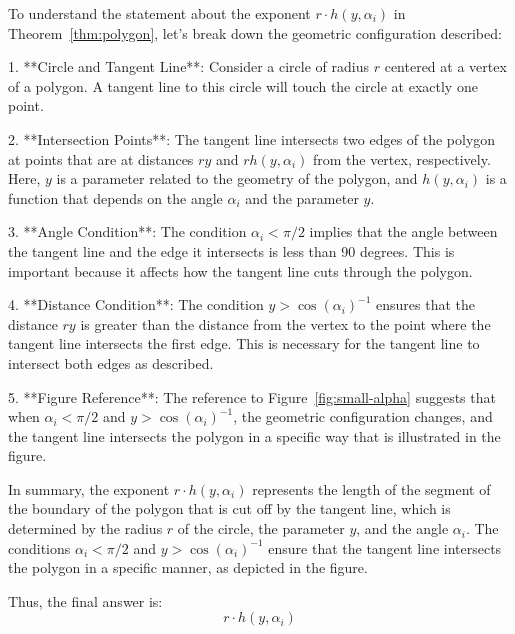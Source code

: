 To understand the statement about the exponent \( r \cdot h(y, \alpha_i) \) in Theorem~\ref{thm:polygon}, let's break down the geometric configuration described:

1. **Circle and Tangent Line**: Consider a circle of radius \( r \) centered at a vertex of a polygon. A tangent line to this circle will touch the circle at exactly one point.

2. **Intersection Points**: The tangent line intersects two edges of the polygon at points that are at distances \( ry \) and \( r h(y, \alpha_i) \) from the vertex, respectively. Here, \( y \) is a parameter related to the geometry of the polygon, and \( h(y, \alpha_i) \) is a function that depends on the angle \( \alpha_i \) and the parameter \( y \).

3. **Angle Condition**: The condition \( \alpha_i < \pi/2 \) implies that the angle between the tangent line and the edge it intersects is less than 90 degrees. This is important because it affects how the tangent line cuts through the polygon.

4. **Distance Condition**: The condition \( y > \cos(\alpha_i)^{-1} \) ensures that the distance \( ry \) is greater than the distance from the vertex to the point where the tangent line intersects the first edge. This is necessary for the tangent line to intersect both edges as described.

5. **Figure Reference**: The reference to Figure~\ref{fig:small-alpha} suggests that when \( \alpha_i < \pi/2 \) and \( y > \cos(\alpha_i)^{-1} \), the geometric configuration changes, and the tangent line intersects the polygon in a specific way that is illustrated in the figure.

In summary, the exponent \( r \cdot h(y, \alpha_i) \) represents the length of the segment of the boundary of the polygon that is cut off by the tangent line, which is determined by the radius \( r \) of the circle, the parameter \( y \), and the angle \( \alpha_i \). The conditions \( \alpha_i < \pi/2 \) and \( y > \cos(\alpha_i)^{-1} \) ensure that the tangent line intersects the polygon in a specific manner, as depicted in the figure.

Thus, the final answer is:
\[
\boxed{r \cdot h(y, \alpha_i)}
\]